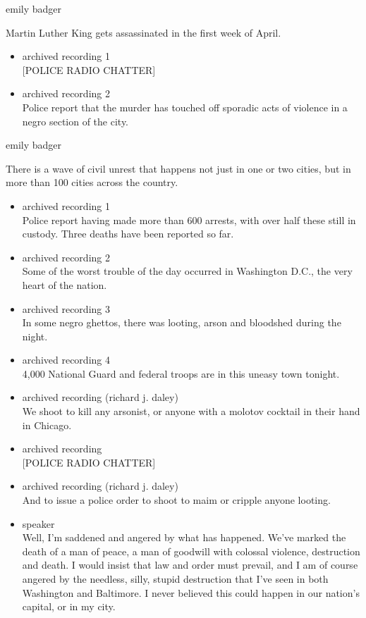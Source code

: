 emily badger

Martin Luther King gets assassinated in the first week of April.

\begin{itemize}
\item
  archived recording 1\\
  {[}POLICE RADIO CHATTER{]}
\item
  archived recording 2\\
  Police report that the murder has touched off sporadic acts of
  violence in a negro section of the city.
\end{itemize}

emily badger

There is a wave of civil unrest that happens not just in one or two
cities, but in more than 100 cities across the country.

\begin{itemize}
\item
  archived recording 1\\
  Police report having made more than 600 arrests, with over half these
  still in custody. Three deaths have been reported so far.
\item
  archived recording 2\\
  Some of the worst trouble of the day occurred in Washington D.C., the
  very heart of the nation.
\item
  archived recording 3\\
  In some negro ghettos, there was looting, arson and bloodshed during
  the night.
\item
  archived recording 4\\
  4,000 National Guard and federal troops are in this uneasy town
  tonight.
\item
  archived recording (richard j. daley)\\
  We shoot to kill any arsonist, or anyone with a molotov cocktail in
  their hand in Chicago.
\item
  archived recording\\
  {[}POLICE RADIO CHATTER{]}
\item
  archived recording (richard j. daley)\\
  And to issue a police order to shoot to maim or cripple anyone
  looting.
\item
  speaker\\
  Well, I'm saddened and angered by what has happened. We've marked the
  death of a man of peace, a man of goodwill with colossal violence,
  destruction and death. I would insist that law and order must prevail,
  and I am of course angered by the needless, silly, stupid destruction
  that I've seen in both Washington and Baltimore. I never believed this
  could happen in our nation's capital, or in my city.
\end{itemize}

